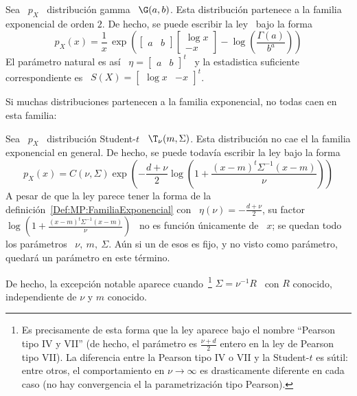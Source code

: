 \begin{ejemplo}
  Sea \ $p_X$ \ distribuci\'on gamma \ $\G(a,b)$.  Esta distribuci\'on partenece
  a la familia exponencial  de orden $2$.  De hecho, se puede  escribir la ley \
  bajo la forma
  \[
  p_X(x)     =    \frac{1}{x}    \,     \exp\left(    \begin{bmatrix}     a    &
      b \end{bmatrix} \begin{bmatrix}  \log x \\ - x  \end{bmatrix} - \log\left(
      \frac{\Gamma(a)}{b^a} \right)\right)
  \]
  El   par\'ametro  natural   es   as\'i   \  $\eta   =   \begin{bmatrix}  a   &
    b \end{bmatrix}^t$ \ y la  estadistica suficiente correspondiente es \ $S(X)
  = \begin{bmatrix} \log x & - x \end{bmatrix}^t$.
\end{ejemplo}

Si muchas distribuciones  partenecen a la familia exponencial,  no todas caen en
esta familia:
%
\begin{ejemplo}
  Sea  \   $p_X$  \  distribuci\'on  Student-$t$   \  $\T_\nu(m,\Sigma)$.   Esta
  distribuci\'on no cae el la familia exponencial en general. De hecho, se puede
  todav\'ia escribir la ley bajo la forma
  \[
  p_X(x)   =  C(\nu,\Sigma)   \exp\left(  -   \frac{d+\nu}{2}  \log\left(   1  +
      \frac{(x-m)^t \Sigma^{-1} (x-m)}{\nu} \right) \right)
  \]
  A    pesar   de    que    la   ley    parece    tener   la    forma   de    la
  definici\'on~\ref{Def:MP:FamiliaExponencial}    con   \    $\eta(\nu)    =   -
  \frac{d+\nu}{2}$,  su  factor  \  $\log\left( 1  +  \frac{(x-m)^t  \Sigma^{-1}
      (x-m)}{\nu} \right)$  \ no es funci\'on  \'unicamente de \  $x$; se quedan
  todo los par\'ametros \ $\nu, \: m, \: \Sigma$. A\'un si un de esos es fijo, y
  no visto como par\'ametro, quedar\'a un par\'ametro en este t\'ermino.

  De hecho,  la excepci\'on notable aparece  cuando~\footnote{Es precisamente de
    esta forma que la  ley aparece bajo el nombre ``Pearson tipo  IV y VII'' (de
    hecho, el par\'ametro es $\frac{\nu+d}{2}$  entero en la ley de Pearson tipo
    VII).  La  diferencia entre  la Pearson tipo  IV o  VII y la  Student-$t$ es
    s\'util: entre otros, el comportamiento en $\nu \to \infty$ es drasticamente
    diferente en  cada caso  (no hay convergencia  el la  parametrizaci\'on tipo
    Pearson).}  $\Sigma = \nu^{-1} R$ \ con $R$ conocido, independiente de $\nu$
  y $m$ conocido.
\end{ejemplo}

